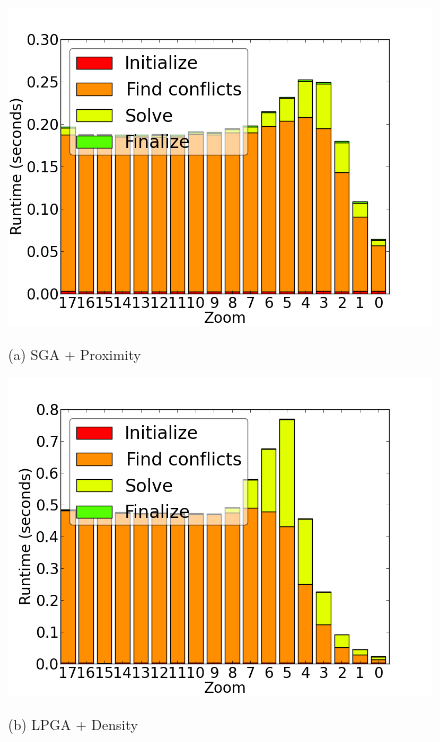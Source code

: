 \begin{figure}[tb]
  \begin{minipage}{0.329\linewidth}
    \centerline{\includegraphics[width=1.0\linewidth]{./figs/prelim_pnt_7k_airports_heuristic_B.png}}
    \centerline{(a) SGA + Proximity}
  \end{minipage} \hfill
  \begin{minipage}{0.329\linewidth}
    \centerline{\includegraphics[width=1.0\linewidth]{./figs/prelim_pnt_7k_airports_lp_A.png}}
    \centerline{(b) LPGA + Density}
  \end{minipage} \hfill
  \begin{minipage}{0.329\linewidth}

\end{minipage}
\end{figure}
